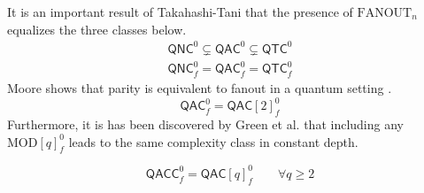 %
It is an important result of Takahashi-Tani \cite{Takahashi2011} that the presence of
$\text{FANOUT}_n$ equalizes the three classes below.
%
\begin{eqnarray}
\textsf{QNC}^0 \subsetneq \textsf{QAC}^0 \subsetneq \textsf{QTC}^0\\
\textsf{QNC}^0_f = \textsf{QAC}^0_f = \textsf{QTC}^0_f
\end{eqnarray}
%
Moore shows that parity is equivalent to fanout in a quantum setting \cite{Moore1999}.
%
\begin{equation}
\textsf{QAC}^0_f = \textsf{QAC}[2]^0_f
\end{equation}
%
Furthermore, it is has been discovered by Green et al. \cite{Green2001} that including any $\text{MOD}[q]^0_f$
leads to the same complexity class in constant depth.

\begin{equation}
\textsf{QACC}^0_f = \textsf{QAC}[q]^0_f \qquad \forall q \ge 2
\end{equation}